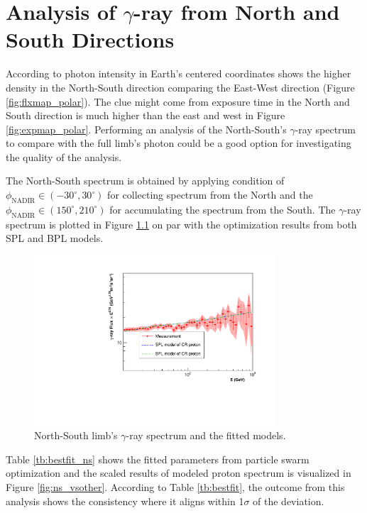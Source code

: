 \chapter{Analysis of $\gamma$-ray from North and South Directions}
\label{appendix:ns_analysis}


According to photon intensity in Earth's centered coordinates
shows the higher density in the North-South direction comparing 
the East-West direction (Figure \ref{fig:flxmap_polar}).
The clue might come from exposure time in the North and South direction
is much higher than the east and west in Figure \ref{fig:expmap_polar}.
Performing an analysis of the North-South's $\gamma$-ray spectrum 
to compare with the full limb's photon could be a good option for 
investigating the quality of the analysis.

The North-South spectrum is obtained by applying condition of 
$\phi_\text{NADIR} \in (-30^{\circ}, 30^{\circ})$ for collecting
spectrum from the North and the $\phi_\text{NADIR} \in (150^{\circ}, 210^{\circ})$
for accumulating the spectrum from the South. The $\gamma$-ray
spectrum is plotted in Figure \ref{fig:ns_fit_gamma} on par with 
the optimization results from both SPL and BPL models.


\begin{figure}[h]
    \centering
    \includegraphics[width=0.8\textwidth]{appendix/ns_analysis/figures/fitted_result.pdf}
    \caption{North-South limb's $\gamma$-ray spectrum and the fitted models.}
    \label{fig:ns_fit_gamma}
\end{figure}

Table \ref{tb:bestfit_ns} shows the fitted parameters from
particle swarm optimization and the scaled results of modeled
proton spectrum is visualized in Figure \ref{fig:ns_vsother}.
According to Table \ref{tb:bestfit}, the outcome from this analysis 
shows the consistency where it aligns within 1$\sigma$ of the deviation.

